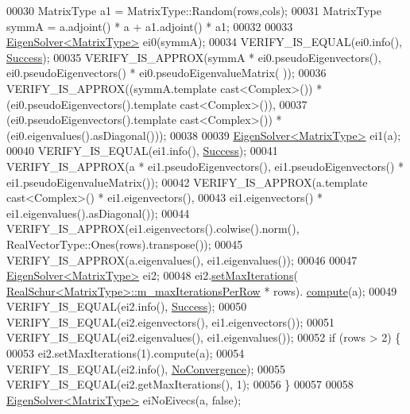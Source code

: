 \begin{DoxyCode}
00030   MatrixType a1 = MatrixType::Random(rows,cols);
00031   MatrixType symmA =  a.adjoint() * a + a1.adjoint() * a1;
00032 
00033   \hyperlink{group___eigenvalues___module_class_eigen_1_1_eigen_solver}{EigenSolver<MatrixType>} ei0(symmA);
00034   VERIFY\_IS\_EQUAL(ei0.info(), \hyperlink{group__enums_gga85fad7b87587764e5cf6b513a9e0ee5ea52581b035f4b59c203b8ff999ef5fcea}{Success});
00035   VERIFY\_IS\_APPROX(symmA * ei0.pseudoEigenvectors(), ei0.pseudoEigenvectors() * ei0.pseudoEigenvalueMatrix(
      ));
00036   VERIFY\_IS\_APPROX((symmA.template cast<Complex>()) * (ei0.pseudoEigenvectors().template cast<Complex>()),
00037     (ei0.pseudoEigenvectors().template cast<Complex>()) * (ei0.eigenvalues().asDiagonal()));
00038 
00039   \hyperlink{group___eigenvalues___module_class_eigen_1_1_eigen_solver}{EigenSolver<MatrixType>} ei1(a);
00040   VERIFY\_IS\_EQUAL(ei1.info(), \hyperlink{group__enums_gga85fad7b87587764e5cf6b513a9e0ee5ea52581b035f4b59c203b8ff999ef5fcea}{Success});
00041   VERIFY\_IS\_APPROX(a * ei1.pseudoEigenvectors(), ei1.pseudoEigenvectors() * ei1.pseudoEigenvalueMatrix());
00042   VERIFY\_IS\_APPROX(a.template cast<Complex>() * ei1.eigenvectors(),
00043                    ei1.eigenvectors() * ei1.eigenvalues().asDiagonal());
00044   VERIFY\_IS\_APPROX(ei1.eigenvectors().colwise().norm(), RealVectorType::Ones(rows).transpose());
00045   VERIFY\_IS\_APPROX(a.eigenvalues(), ei1.eigenvalues());
00046 
00047   \hyperlink{group___eigenvalues___module_class_eigen_1_1_eigen_solver}{EigenSolver<MatrixType>} ei2;
00048   ei2.\hyperlink{group___eigenvalues___module_a6cff220aadfd8d8c1366b915ddefd164}{setMaxIterations}(
      \hyperlink{group___eigenvalues___module_class_eigen_1_1_real_schur}{RealSchur<MatrixType>::m\_maxIterationsPerRow} * rows).
      \hyperlink{group___eigenvalues___module_a38d032b75b3e75640e3db42e7ab20c24}{compute}(a);
00049   VERIFY\_IS\_EQUAL(ei2.info(), \hyperlink{group__enums_gga85fad7b87587764e5cf6b513a9e0ee5ea52581b035f4b59c203b8ff999ef5fcea}{Success});
00050   VERIFY\_IS\_EQUAL(ei2.eigenvectors(), ei1.eigenvectors());
00051   VERIFY\_IS\_EQUAL(ei2.eigenvalues(), ei1.eigenvalues());
00052   \textcolor{keywordflow}{if} (rows > 2) \{
00053     ei2.setMaxIterations(1).compute(a);
00054     VERIFY\_IS\_EQUAL(ei2.info(), \hyperlink{group__enums_gga85fad7b87587764e5cf6b513a9e0ee5eaba1c8763d1179778070f365ecc4157a8}{NoConvergence});
00055     VERIFY\_IS\_EQUAL(ei2.getMaxIterations(), 1);
00056   \}
00057 
00058   \hyperlink{group___eigenvalues___module_class_eigen_1_1_eigen_solver}{EigenSolver<MatrixType>} eiNoEivecs(a, \textcolor{keyword}{false});

\end{DoxyCode}
